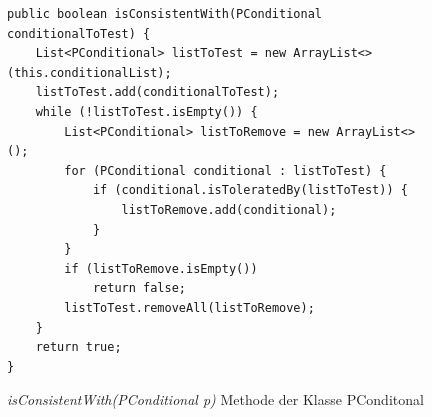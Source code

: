 \documentclass[12pt,a4paper]{article}
\begin{document}
\begin{figure}
\begin{lstlisting}
public boolean isConsistentWith(PConditional conditionalToTest) {
    List<PConditional> listToTest = new ArrayList<>(this.conditionalList);
    listToTest.add(conditionalToTest);
    while (!listToTest.isEmpty()) {
        List<PConditional> listToRemove = new ArrayList<>();
        for (PConditional conditional : listToTest) {
            if (conditional.isToleratedBy(listToTest)) {
                listToRemove.add(conditional);
            }
        }
        if (listToRemove.isEmpty())
            return false;
        listToTest.removeAll(listToRemove);
    }
    return true;
}
\end{lstlisting}
\caption{\textit{isConsistentWith(PConditional p)} Methode der Klasse PConditonal}
\label{code:kb-consistent}
\end{figure} 
\end{document}
